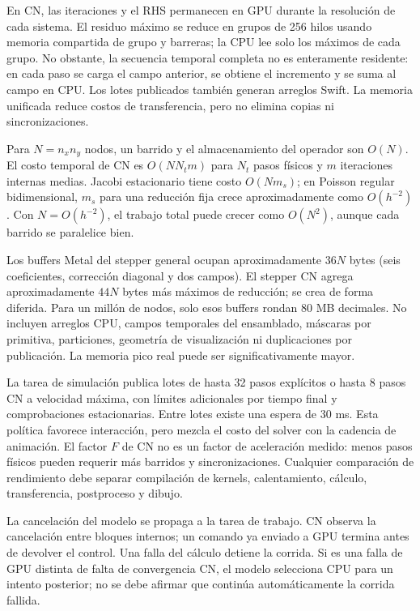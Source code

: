 \documentclass[11pt,a4paper]{article}
\begin{document}
En CN, las iteraciones y el RHS permanecen en GPU durante la resolución de
cada sistema. El residuo máximo se reduce en grupos de 256 hilos usando memoria
compartida de grupo y barreras; la CPU lee solo los máximos de cada grupo.
No obstante, la secuencia temporal completa no es enteramente residente: en
cada paso se carga el campo anterior, se obtiene el incremento y se suma al
campo en CPU. Los lotes publicados también generan arreglos Swift. La memoria
unificada reduce costos de transferencia, pero no elimina copias ni
sincronizaciones.

Para $N=n_xn_y$ nodos, un barrido y el almacenamiento del operador son $O(N)$.
El costo temporal de CN es $O(NN_t m)$ para $N_t$ pasos físicos y $m$
iteraciones internas medias. Jacobi estacionario tiene costo $O(Nm_s)$;
en Poisson regular bidimensional, $m_s$ para una reducción fija crece
aproximadamente como $O(h^{-2})$. Con $N=O(h^{-2})$, el trabajo total puede
crecer como $O(N^2)$, aunque cada barrido se paralelice bien.

Los buffers Metal del stepper general ocupan aproximadamente $36N$ bytes
(seis coeficientes, corrección diagonal y dos campos). El stepper CN agrega
aproximadamente $44N$ bytes más máximos de reducción; se crea de forma diferida.
Para un millón de nodos, solo esos buffers rondan 80 MB decimales. No incluyen
arreglos CPU, campos temporales del ensamblado, máscaras por primitiva,
particiones, geometría de visualización ni duplicaciones por publicación.
La memoria pico real puede ser significativamente mayor.

La tarea de simulación publica lotes de hasta 32 pasos explícitos o hasta
8 pasos CN a velocidad máxima, con límites adicionales por tiempo final y
comprobaciones estacionarias. Entre lotes existe una espera de 30 ms. Esta
política favorece interacción, pero mezcla el costo del solver con la cadencia
de animación. El factor $F$ de CN no es un factor de aceleración medido:
menos pasos físicos pueden requerir más barridos y sincronizaciones.
Cualquier comparación de rendimiento debe separar compilación de kernels,
calentamiento, cálculo, transferencia, postproceso y dibujo.

La cancelación del modelo se propaga a la tarea de trabajo. CN observa la
cancelación entre bloques internos; un comando ya enviado a GPU termina antes
de devolver el control. Una falla del cálculo detiene la corrida. Si es una
falla de GPU distinta de falta de convergencia CN, el modelo selecciona CPU
para un intento posterior; no se debe afirmar que continúa automáticamente
la corrida fallida.
\end{document}
